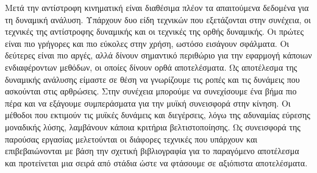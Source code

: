 Μετά την αντίστροφη κινηματική είναι διαθέσιμα πλέον τα απαιτούμενα δεδομένα για τη δυναμική ανάλυση. Υπάρχουν δυο είδη τεχνικών που εξετάζονται στην συνέχεια, οι τεχνικές της αντίστροφης δυναμικής και οι τεχνικές της ορθής δυναμικής. Οι πρώτες είναι πιο γρήγορες και πιο εύκολες στην χρήση, ωστόσο εισάγουν σφάλματα. Οι δεύτερες είναι πιο αργές, αλλά δίνουν σημαντικό περιθώριο για την εφαρμογή κάποιων ενδιαφέροντων μεθόδων, οι οποίες δίνουν ορθά αποτελέσματα. Ως αποτέλεσμα της δυναμικής ανάλυσης είμαστε σε θέση να γνωρίζουμε τις ροπές και τις δυνάμεις που ασκούνται στις αρθρώσεις. Στην συνέχεια μπορούμε να συνεχίσουμε ένα βήμα πιο πέρα και να εξάγουμε συμπεράσματα για την μυϊκή συνεισφορά στην κίνηση. Οι μέθοδοι που εκτιμούν τις μυϊκές δυνάμεις και διεγέρσεις, λόγω της αδυναμίας εύρεσης μοναδικής λύσης, λαμβάνουν κάποια κριτήρια βελτιστοποίησης. Ως συνεισφορά της παρούσας εργασίας μελετούνται οι διάφορες τεχνικές που υπάρχουν και επιβεβαιώνονται με βάση την σχετική βιβλιογραφία για το παραγόμενο αποτέλεσμα και προτείνεται μια σειρά από στάδια ώστε να φτάσουμε σε αξιόπιστα αποτελέσματα.

